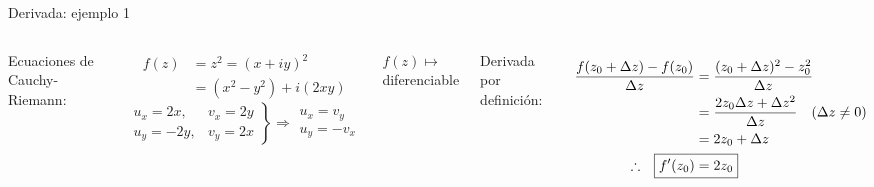 \documentclass[9pt, aspectratio=169]{beamer}
\begin{document}
\begin{frame}{Derivada: ejemplo 1}
 \begin{columns}[t]
  Ecuaciones de Cauchy-Riemann:
  
  \begin{align*}
   f(z) &= z^2 = (x + i y)^2 \\
        &= (x^2 - y^2) + i (2xy)
  \end{align*}
  \[\left.{ \begin{array}{ll}
             u_x = 2 x, & v_x = 2 y \\
             u_y = -2y, & v_y = 2 x 
            \end{array}}  \right\}
            \Rightarrow \begin{array}{l}
               u_x = v_y \\
               u_y = -v_x
              \end{array}
 \]
 \begin{center}
 $f(z) \mapsto $ \alert{diferenciable} 
\end{center}
 \pause
 
  Derivada por definición:
  
  \begin{align*}
   \frac{f(z_0 + \Delta z) - f(z_0)}{\Delta z} &= \frac{(z_0 + \Delta z)^2 - z_0^2}{\Delta z} \\
   &= \frac{2 z_0 \Delta z + \Delta z^2}{\Delta z} \quad (\Delta z \neq 0)\\
   &= 2 z_0 + \Delta z \\
   \therefore \hspace{1em} \Aboxed{ f'(z_0) &= 2 z_0 }
  \end{align*}
 \end{columns}
\end{frame}
\end{document}
